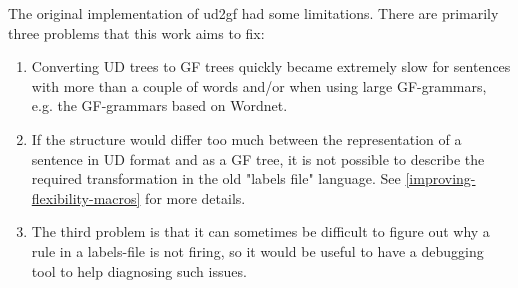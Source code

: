 
The original implementation of ud2gf had some limitations. There are primarily three problems that this work aims to fix:

\begin{enumerate}
    \item Converting UD trees to GF trees quickly became extremely slow for sentences with more than a couple of words and/or
    when using large GF-grammars, e.g. the GF-grammars based on Wordnet\cite{angelov2016predicting}.
\item
    If the structure would differ too much between the representation of a sentence in UD format and as a GF tree, it is not possible to describe the required transformation in the old "labels file" language. See \autoref{improving-flexibility-macros} for more details.
\item
    The third problem is that it can sometimes be difficult to figure out why a rule in a labels-file is not firing, so it would be useful to have a debugging tool to help diagnosing such issues.
\end{enumerate}


%
%
%






